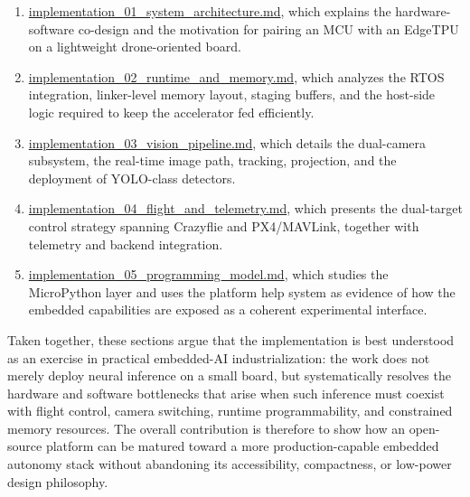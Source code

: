 \begin{enumerate}
\def\labelenumi{\arabic{enumi}.}
\tightlist
\item
  \url{implementation_01_system_architecture.md}, which explains the
  hardware-software co-design and the motivation for pairing an MCU with
  an EdgeTPU on a lightweight drone-oriented board.
\item
  \url{implementation_02_runtime_and_memory.md}, which analyzes the RTOS
  integration, linker-level memory layout, staging buffers, and the
  host-side logic required to keep the accelerator fed efficiently.
\item
  \url{implementation_03_vision_pipeline.md}, which details the
  dual-camera subsystem, the real-time image path, tracking, projection,
  and the deployment of YOLO-class detectors.
\item
  \url{implementation_04_flight_and_telemetry.md}, which presents the
  dual-target control strategy spanning Crazyflie and PX4/MAVLink,
  together with telemetry and backend integration.
\item
  \url{implementation_05_programming_model.md}, which studies the
  MicroPython layer and uses the platform help system as evidence of how
  the embedded capabilities are exposed as a coherent experimental
  interface.
\end{enumerate}

Taken together, these sections argue that the implementation is best
understood as an exercise in practical embedded-AI industrialization:
the work does not merely deploy neural inference on a small board, but
systematically resolves the hardware and software bottlenecks that arise
when such inference must coexist with flight control, camera switching,
runtime programmability, and constrained memory resources. The overall
contribution is therefore to show how an open-source platform can be
matured toward a more production-capable embedded autonomy stack without
abandoning its accessibility, compactness, or low-power design
philosophy.
